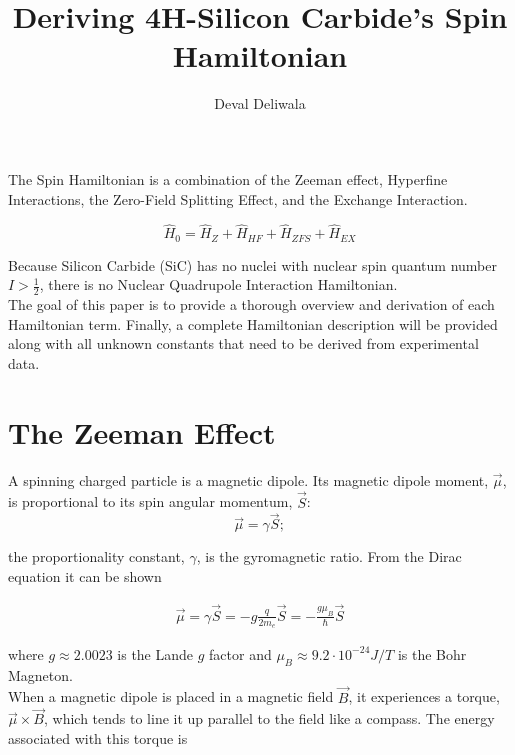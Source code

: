 \documentclass[svgnames]{article}
\title{Deriving 4H-Silicon Carbide's Spin Hamiltonian}
\author{Deval Deliwala}
\begin{document}
\maketitle

The Spin Hamiltonian is a combination of the Zeeman effect, Hyperfine
Interactions, the Zero-Field Splitting Effect, and the Exchange Interaction. 

\begin{redbox}
  \[
      \hat{H}_0 = \hat{H}_Z + \hat{H}_{HF} + \hat{H}_{ZFS} + \hat{H}_{EX}
  \] 
\end{redbox}

Because Silicon Carbide (SiC) has no nuclei with nuclear spin quantum number $I
> \frac{1}{2}$, there is no Nuclear Quadrupole Interaction Hamiltonian. \\ 

The goal of this paper is to provide a thorough overview and derivation of each Hamiltonian
term. Finally, a complete Hamiltonian description will be provided along with
all unknown constants that need to be derived from experimental data. 

\tableofcontents

\newpage

\section{The Zeeman Effect}

A spinning charged particle is a magnetic dipole. Its magnetic dipole moment,
$\vec{\mu}$, is proportional to its spin angular momentum, $\vec{S}$: 
\[
\vec{\mu} = \gamma \vec{S}; 
\] 

the proportionality constant, $\gamma$, is the gyromagnetic ratio. From the
Dirac equation it can be shown  

\begin{align} \label{Dirac}
\vec{\mu} = \gamma \vec{S} = -g\frac{q}{2m_e}\vec{S} =
-\frac{g\mu_B}{\hbar}\vec{S}
\end{align} \vspace{3px}

where $g \approx 2.0023$ is the Lande $g$ factor and $\mu_B \approx 9.2 \cdot
10^{-24} J/T$ is the Bohr Magneton. \\

When a magnetic dipole is placed in a magnetic field $\vec{B}$, it
experiences a torque, $\vec{\mu}\times\vec{B}$, which tends to line it up
parallel to the field like a compass. The energy associated with this torque is 
\end{document}
